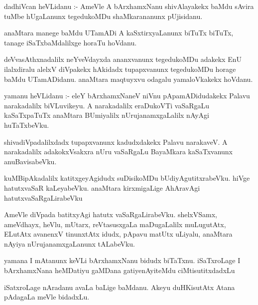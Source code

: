 \documentclass{article}
\begin{document}
\begin{mn}
dadhiVcan  heVLidanu :- AmeVle  A  bArxhamxNanu  shivAlayakekx  baMdu  sAvira  tuMbe  hUgaLanunx  tegedukoMDu  shaMkarananunx  pUjisidanu.
\end{mn}

\begin{mn}
anaMtara  manege  baMdu  UTamADi  A  kaSxtirxyaLanunx  biTuTx  biTuTx,  tanage  iSaTxbaMdalilxge  horaTu hoVdanu.
\end{mn}

\begin{mn}
deVvasAthxnadalilx  neYveVdayxda  ananxvanunx  tegedukoMDu  adakekx  EnU  ilalxdiralu  alelxV  diVpakekx  hAkidadx  
tupapxvanunx  tegedukoMDu  horage  baMdu  UTamADidanu.  anaMtara  maqtuyxvu  odagalu  yamaloVkakekx  hoVdanu.  
\end{mn}

\begin{mn}
yamanu  heVLidanu :- eleY  bArxhamxNaneV  niVnu  pApamADidudakekx  Palavu  narakadalilx  biVLuvikeyu.  A  narakadalilx  
eraDukoVTi  vaSaRgaLu  kaSaTxpaTuTx  anaMtara  BUmiyalilx  nUrujanamxgaLalilx  nAyAgi  huTaTxbeVku.
\end{mn}

\begin{mn}
shivadiVpadalilxdadx  tupapxvanunx  kadudxdakekx  Palavu  narakaveV.  A  narakadalilx  adakokxVsakxra  nUru  
vaSaRgaLu  BayaMkara  kaSaTxvanunx  anuBavisabeVku.
\end{mn}

\begin{mn}
kuMBipAkadalilx  katitxgeyAgidudx  suDisikoMDu  bUdiyAgutitxrabeVku.  hiVge  hatutxvaSaR  kaLeyabeVku.  anaMtara  
kirxmigaLige  AhAravAgi  hatutxvaSaRgaLirabeVku
\end{mn}

\begin{mn}
AmeVle  diVpada batitxyAgi  hatutx  vaSaRgaLirabeVku.  shelxVSamx,  ameVdhayx,  heVlu,  mUtarx,  reVtasusxgaLa  
maDugaLalilx  muLugutAtx,  ELutAtx  avanenxV  tinunxtAtx  idudx,  pApavu  matUtx  uLiyalu,  anaMtara  nAyiya  
nUrujanamxgaLanunx  tALabeVku.
\end{mn}

\begin{mn}
yamana  I  mAtanunx  keVLi  bArxhamxNanu  bidudx biTaTxnu.  iSaTxroLage  I  bArxhamxNana  heMDatiyu  gaMDana  
gatiyenAyiteMdu  ciMtisutitxdadxLu
\end{mn}

\begin{mn}
iSatxroLage  nAradanu  avaLa  baLige  baMdanu.  Akeyu  duHKisutAtx  Atana  pAdagaLa  meVle  bidadxLu.
\end{mn}
\end{document}
